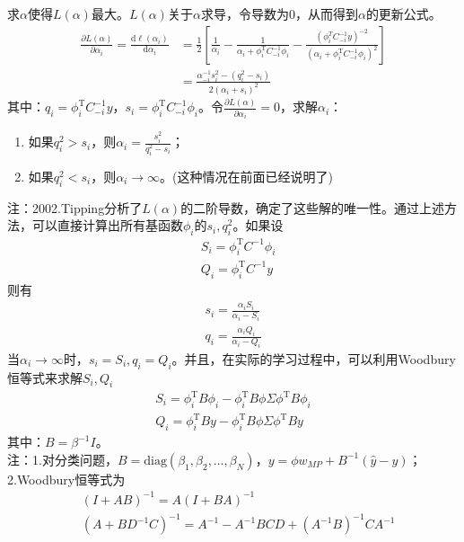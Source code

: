         求$\alpha$使得$L(\alpha)$最大。$L(\alpha)$关于$\alpha$求导，令导数为0，从而得到$\alpha$的更新公式。
        \begin{align*}
        \frac{\partial L(\alpha)}{\partial\alpha_i} = \frac{\mathrm{d}\ell (\alpha_i)}{\mathrm{d}\alpha_i}& = \frac 12 \left[ \frac{1}{\alpha_i} - \frac{1}{\alpha_i + \phi_i^\mathrm{T}C_{-i}^{-1} \phi_i} - \frac{(\phi_i^{T}C_{-i}^{-1}y)^{-2}}{(\alpha_i+\phi_i^\mathrm{T}C_{-i}^{-1}\phi_i)^2} \right] \\
        &=\frac{\alpha_{-i}^{-1}s_i^2 - (q_i^2 - s_i)}{2(\alpha_i+s_i)^2}
        \end{align*}
        其中：$q_i = \phi_i^\mathrm{T} C_{-i}^{-1} y$，$s_i = \phi_i^\mathrm{T} C_{-i}^{-1}\phi_i$。令$\frac{\partial L(\alpha)}{\partial \alpha_i} = 0$，求解$\alpha_i$：
        \begin{enumerate}
        \item 如果$q_i^2 >s_i$，则$\alpha_i = \frac{s_i^2}{q_i^2 - s_i}$；
        \item 如果$q_i ^2<s_i$，则$\alpha_i \rightarrow \infty$。(这种情况在前面已经说明了)
        \end{enumerate}
        注：2002.Tipping分析了$L(\alpha)$的二阶导数，确定了这些解的唯一性。通过上述方法，可以直接计算出所有基函数$\phi_i$的$s_i,q_i^2$。如果设
        \begin{align*}
        &S_i = \phi_i^\mathrm{T} C^{-1}\phi_i\\
        &Q_i = \phi_i^\mathrm{T} C^{-1}y
        \end{align*}
        则有
        \begin{align*}
        s_i = \frac{\alpha_iS_i}{\alpha_i - S_i}\\
        q_i = \frac{\alpha_iQ_i}{\alpha_i - Q_i}
        \end{align*}
        当$\alpha _i \rightarrow \infty$时，$s_i = S_i,q_i = Q_i$。并且，在实际的学习过程中，可以利用Woodbury恒等式来求解$S_i,Q_i$
        \begin{align*}
        S_i = \phi_i^\mathrm{T} B\phi_i - \phi _i^\mathrm{T}B\phi \Sigma \phi^\mathrm{T}B\phi_i\\
        Q_i = \phi_i^\mathrm{T} By - \phi _i^\mathrm{T}B\phi \Sigma \phi^\mathrm{T}By
        \end{align*}
        其中：$B = \beta ^{-1}I$。\\
        注：1.对分类问题，$B = \mathrm{diag}{(\beta_1,\beta_2,\dots,\beta_N)}$，$y = \phi w_{MP} + B^{-1}(\hat{y}-y)$；2.Woodbury恒等式为
        \begin{align*}
        &(I+AB)^{-1} = A(I+BA)^{-1}\\
        &(A+BD^{-1}C)^{-1} = A^{-1}-A^{-1}BCD+(A^{-1}B)^{-1}CA^{-1}
        \end{align*}

